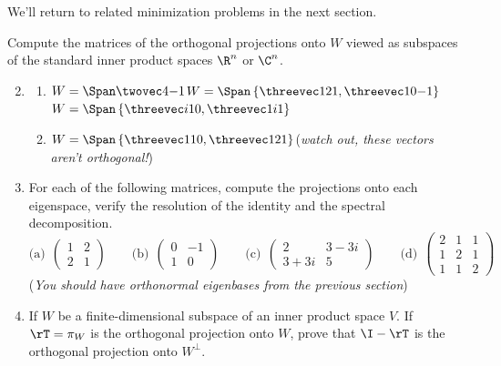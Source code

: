 We'll return to related minimization problems in the next section.

\vfil

\begin{exercises}
\exstart Compute the matrices of the orthogonal projections onto $W$ viewed as subspaces of the standard inner product spaces $\R^n$ or $\C^n$.

\begin{enumerate}\setcounter{enumi}{1}
  \item[]\begin{enumerate}
    \item $W=\Span\twovec 4{-1}$\hfill {}\space $W=\Span\left\{\threevec 121,\threevec 10{-1}\right\}$ \hfill {}\space
    $W=\Span\left\{\threevec i10,\threevec 1i1\right\}$
    \item[(d)] $W=\Span\left\{\threevec 110,\threevec 121\right\}$\quad (\emph{watch out, these vectors aren't orthogonal!})
	\end{enumerate}
	\goodbreak

	\item For each of the following matrices, compute the projections onto each eigenspace, verify the resolution of the identity and the spectral decomposition.\vspace{-5pt}
	\[\text{(a)}\ \ \begin{pmatrix}
    1&2\\2&1
    \end{pmatrix}
    \qquad
    \text{(b)}\ \ \begin{pmatrix}
    0&-1\\1&0
    \end{pmatrix}
    \qquad
    \text{(c)}\ \ \begin{pmatrix}
    2&3-3i\\3+3i&5
    \end{pmatrix}
    \qquad
    \text{(d)}\ \ \begin{pmatrix}
    2&1&1\\1&2&1\\1&1&2
    \end{pmatrix}
    \]
    \vspace{-5pt}
    (\emph{You should have orthonormal eigenbases from the previous section})
	
	\item If $W$ be a finite-dimensional subspace of an inner product space $V$. If $\rT=\pi_W$ is the orthogonal projection onto $W$, prove that $\I-\rT$ is the orthogonal projection onto $W^\perp$.
	

\end{enumerate}
\end{exercises}
